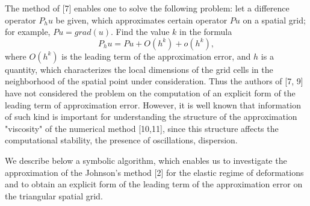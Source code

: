    The method of [7] enables one to solve the following problem: let a
difference operator $P_hu$ be given, which approximates certain operator $Pu$
on a spatial grid; for example, $Pu=grad(u)$. Find the value $k$ in the
formula
$$P_hu=Pu + O(h^k) + o(h^k),$$
where $O(h^k)$ is the leading term of the approximation error, and $h$ is a
quantity, which characterizes the local dimensions of the grid cells in the
neighborhood of the spatial point under consideration. Thus the authors of
[7, 9] have not considered the problem on the computation of an explicit
form of the leading term of approximation error. However, it is well known that
information of such kind is important for understanding the structure of the
approximation "viscosity" of the numerical method [10,11], since this structure
affects the computational stability, the presence of oscillations, dispersion.

   We describe below a symbolic algorithm, which enables us to investigate the
approximation of the Johnson's method [2] for the elastic regime
of deformations and to obtain an explicit form of the leading term of the
approximation error on the triangular spatial grid.

